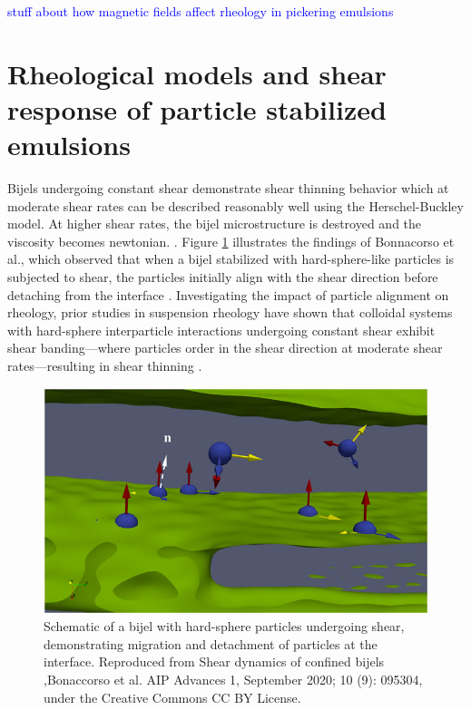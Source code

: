 \textcolor{blue}{stuff about how magnetic fields affect rheology in pickering emulsions}



\section{Rheological models and shear response of particle stabilized emulsions}

Bijels undergoing constant shear demonstrate shear thinning behavior which at moderate shear rates can be described reasonably well using the Herschel-Buckley
model. \cite{macmillan_rheological_2019, wang_morphology_2023} At higher shear rates, the bijel microstructure is destroyed and the viscosity becomes newtonian. 
\cite{cai_bijels_2017,bonaccorso_shear_2020}. Figure \ref{fig:bijel_under_shear} illustrates the findings of Bonnacorso et al., which observed that when a bijel 
stabilized with hard-sphere-like particles is subjected to shear, the particles initially align with the shear direction before detaching from the interface 
\cite{bonaccorso_shear_2020}. Investigating the impact of particle alignment on rheology, prior studies in suspension rheology have shown that colloidal systems 
with hard-sphere interparticle interactions undergoing constant shear exhibit shear banding—where particles order in the shear direction at moderate shear rates—resulting 
in shear thinning \cite{vermant_flow-induced_2005, brader_nonlinear_2010}. 

\begin{figure}
    \centering
    \includegraphics[scale = 3]{figures/literature_review/bijel_under_shear.jpeg}
    \caption{Schematic of a bijel with hard-sphere particles undergoing shear, demonstrating migration and detachment of 
             particles at the interface. \cite{bonaccorso_shear_2020} Reproduced from Shear dynamics of confined bijels
             ,Bonaccorso et al. AIP Advances 1, September 2020; 10 (9): 095304, under the Creative Commons CC BY License.}
    \label{fig:bijel_under_shear}
\end{figure} 

